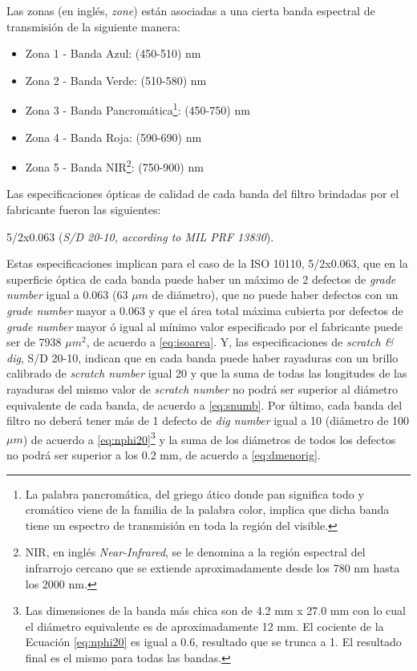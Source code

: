 Las zonas (en inglés, \textit{zone}) están asociadas a una cierta banda espectral de transmisión de la siguiente manera:
\begin{itemize}
\justifying
\item Zona 1 - Banda Azul: (450-510) nm
\item Zona 2 - Banda Verde: (510-580) nm
\item Zona 3 - Banda Pancromática\footnote{La palabra pancromática, del griego ático donde pan significa todo y cromático viene de la familia de la palabra color, implica que dicha banda tiene un espectro de transmisión en toda la región del visible.}: (450-750) nm
\item Zona 4 - Banda Roja: (590-690) nm
\item Zona 5 - Banda NIR\footnote{NIR, en inglés \textit{Near-Infrared}, se le denomina a la región espectral del infrarrojo cercano que se extiende aproximadamente desde los 780 nm hasta los 2000 nm.}: (750-900) nm
\end{itemize}
 \hspace{0.5cm}Las especificaciones ópticas de calidad de cada banda del filtro brindadas por el fabricante fueron las siguientes:
\begin{center}
5/2x0.063 (\textit{S/D 20-10, according to MIL PRF 13830}).
\end{center}
\hspace{0.5cm}Estas especificaciones implican para el caso de la ISO 10110, 5/2x0.063, que en la superficie óptica de cada banda puede haber un máximo de 2 defectos de \textit{grade number} igual a 0.063 (63 $\mu m$ de diámetro), que no puede haber defectos con un \textit{grade number} mayor a 0.063 y que el área total máxima cubierta por defectos de \textit{grade number} mayor ó igual al mínimo valor especificado por el fabricante puede ser de 7938 $\mu m^{2}$, de acuerdo a \ref{eq:isoarea}. Y, las especificaciones de \textit{scratch \& dig}, S/D 20-10, indican que en cada banda puede haber rayaduras con un brillo calibrado de \textit{scratch number} igual 20 y que la suma de todas las longitudes de las rayaduras del mismo valor de \textit{scratch number} no podrá ser superior al diámetro equivalente de cada banda, de acuerdo a \ref{eq:snumb}. Por último, cada banda del filtro no deberá tener más de 1 defecto de \textit{dig number} igual a 10 (diámetro de 100 $\mu m$)  de acuerdo a \ref{eq:nphi20}\footnote{Las dimensiones de la banda más chica son de 4.2 mm x 27.0 mm con lo cual el diámetro equivalente es de aproximadamente 12 mm. El cociente de la Ecuación \ref{eq:nphi20} es igual a 0.6, resultado que se trunca a 1. El resultado final es el mismo para todas las bandas.}  y la suma de los diámetros de todos los defectos no podrá ser superior a los 0.2 mm, de acuerdo a \ref{eq:dmenorig}. 

